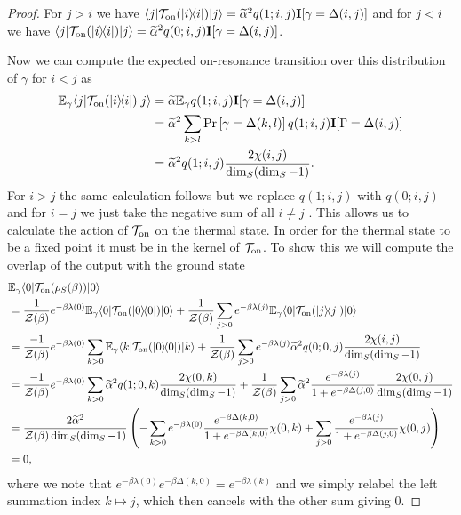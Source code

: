\documentclass{article}
\newcommand{\on}{\rm on}
\newcommand{\ket}[1]{|#1\rangle}
\newcommand{\bra}[1]{\langle #1|}
\newcommand{\ketbra}[2]{| #1\rangle\! \langle #2|}
\newcommand{\prob}[1]{\text{Pr}\left[ #1 \right]}
\newcommand{\partfun}{\mathcal{Z}}
\begin{document}
\begin{proof}
For $j > i$ we have $\bra{j} \mathcal{T}_{\on}(\ketbra{i}{i}) \ket{j} = \widetilde{\alpha}^2 q(1; i, j) \mathbf{I}[\gamma = \Delta(i,j)]$ and for $j < i$ we have $\bra{j} \mathcal{T}_{\on}(\ketbra{i}{i}) \ket{j} = \widetilde{\alpha}^2 q(0; i, j) \mathbf{I}[\gamma = \Delta(i,j)]$. 

Now we can compute the expected on-resonance transition over this distribution of $\gamma$ for $i < j$ as
\begin{align}
    \mathbb{E}_{\gamma} \bra{j} \mathcal{T}_{\on}(\ketbra{i}{i}) \ket{j} &= \widetilde{\alpha} \mathbb{E}_{\gamma} q(1; i, j) \mathbf{I}[\gamma = \Delta(i,j)] \\
    &= \widetilde{\alpha}^2 \sum_{k > l} \prob{\gamma = \Delta(k,l)} q(1; i,j) \mathbf{I}[\Gamma = \Delta(i,j)] \\
    &= \widetilde{\alpha}^2 q(1; i,j) \frac{2 \chi(i,j)}{\dim_S(\dim_S - 1)}.
\end{align}
For $ i > j$ the same calculation follows but we replace $q(1; i, j)$ with $q(0;i,j)$ and for $i = j$ we just take the negative sum of all $i \neq j$ . This allows us to calculate the action of $\mathcal{T}_{\on}$ on the thermal state. In order for the thermal state to be a fixed point it must be in the kernel of $\mathcal{T}_{\on}$. To show this we will compute the overlap of the output with the ground state
\begin{align}
    &\mathbb{E}_{\gamma} \bra{0} \mathcal{T}_{\on}(\rho_S(\beta)) \ket{0} \nonumber \\
    &= \frac{1}{\partfun(\beta)} e^{-\beta \lambda(0)} \mathbb{E}_{\gamma} \bra{0} \mathcal{T}_{\on}(\ketbra{0}{0})\ket{0} + \frac{1}{\partfun(\beta)} \sum_{j > 0} e^{-\beta \lambda(j)} \mathbb{E}_{\gamma}  \bra{0} \mathcal{T}_{\on}(\ketbra{j}{j}) \ket{0} \\
    &= \frac{-1}{\partfun(\beta)} e^{-\beta \lambda(0)} \sum_{k > 0} \mathbb{E}_{\gamma} \bra{k} \mathcal{T}_{\on}(\ketbra{0}{0}) \ket{k} + \frac{1}{\partfun(\beta)} \sum_{j > 0} e^{-\beta \lambda(j)} \widetilde{\alpha}^2 q(0; 0, j) \frac{2 \chi(i,j)}{\dim_S (\dim_S - 1)} \\
    &= \frac{-1}{\partfun(\beta)} e^{-\beta \lambda(0)} \sum_{k > 0} \widetilde{\alpha}^2 q(1; 0, k) \frac{2 \chi(0, k)}{\dim_S(\dim_S - 1)} + \frac{1}{\partfun(\beta)} \sum_{j > 0} \widetilde{\alpha}^2 \frac{e^{-\beta \lambda(j)} }{1 + e^{-\beta \Delta(j, 0)}} \frac{2 \chi(0,j)}{\dim_S (\dim_S - 1)} \\
    &= \frac{2 \widetilde{\alpha}^2}{\partfun(\beta) \dim_S(\dim_S - 1)} \left(-\sum_{k > 0} e^{-\beta \lambda(0)} \frac{e^{-\beta \Delta(k, 0)}}{1 + e^{-\beta \Delta(k,0)}} \chi(0, k) + \sum_{j > 0} \frac{e^{-\beta \lambda(j)}}{1 + e^{-\beta \Delta(j, 0)}} \chi(0, j) \right) \\
    &= 0,
\end{align}
where we note that $e^{-\beta \lambda(0)} e^{-\beta \Delta(k, 0)} = e^{-\beta \lambda(k)}$ and we simply relabel the left summation index $k \mapsto j$, which then cancels with the other sum giving 0.


\end{proof}
\end{document}
